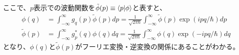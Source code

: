 ここで、$p$表示での波動関数を$\tilde \phi(p) \equiv \braket {p|\phi}$と表すと、
\begin{equation}
\begin{aligned}
  \phi(q) &= \int_{-\infty}^\infty g_q(p) \tilde{\phi}(p) dp = \frac{1}{\sqrt{2\pi\hbar}}\int_{-\infty}^{\infty}\tilde{\phi}(p)\exp(ipq/\hbar)dp\\
  \tilde \phi(p) &= \int_{-\infty}^{\infty}g_p^*(q)\phi(q)dq = \frac{1}{\sqrt{2\pi\hbar}}\int_{-\infty}^{\infty}\phi(q) \exp(-ipq/\hbar)dq
\end{aligned}
\end{equation}
となり、$\phi (q)$と$\tilde \phi (p)$がフーリエ変換・逆変換の関係にあることがわかる。



\printindex

